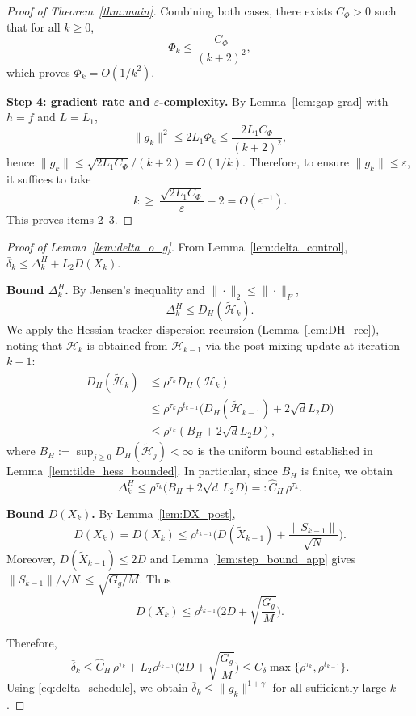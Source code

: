 \documentclass[11pt,a4paper]{article}
\def\cO{O}%
\newcommand{\cO}{\mathcal{O}}
\begin{document}
\begin{proof}[Proof of Theorem~\ref{thm:main}]
Combining both cases, there exists $C_\Phi>0$ such that for all $k\ge 0$,
\[
\Phi_k\le \frac{C_\Phi}{(k+2)^2},
\]
which proves $\Phi_k=\cO(1/k^2)$.

\smallskip
\noindent\textbf{Step 4: gradient rate and $\varepsilon$-complexity.}
By Lemma~\ref{lem:gap-grad} with $h=f$ and $L=L_1$,
\[
\|g_k\|^2\le 2L_1\Phi_k\le \frac{2L_1 C_\Phi}{(k+2)^2},
\]
hence $\|g_k\|\le \sqrt{2L_1 C_\Phi}/(k+2)=\cO(1/k)$.
Therefore, to ensure $\|g_k\|\le \varepsilon$, it suffices to take
\[
k\ \ge\ \frac{\sqrt{2L_1 C_\Phi}}{\varepsilon}-2
=\cO(\varepsilon^{-1}).
\]
This proves items 2--3.
\end{proof}

\begin{proof}[Proof of Lemma~\ref{lem:delta_o_g}]
From Lemma~\ref{lem:delta_control}, $\bar\delta_k\le \Delta_k^H+L_2D(X_k)$.

\smallskip
\noindent\textbf{Bound $\Delta_k^H$.}
By Jensen's inequality and $\|\cdot\|_2\le \|\cdot\|_F$,
\[
\Delta_k^H\le D_H(\tilde{\mathcal H}_k).
\]
We apply the Hessian-tracker dispersion recursion (Lemma~\ref{lem:DH_rec}),
noting that $\mathcal H_k$ is obtained from $\tilde{\mathcal H}_{k-1}$
via the post-mixing update at iteration $k{-}1$:
\begin{align*}
D_H(\tilde{\mathcal H}_k)
&\le \rho^{\tau_k}D_H(\mathcal H_k)\\
&\le \rho^{\tau_k}\rho^{t_{k-1}}\bigl(D_H(\tilde{\mathcal H}_{k-1})
\!+\!2\sqrt{d}L_2D\bigr)\\
&\le \rho^{\tau_k}(B_H\!+\!2\sqrt{d}L_2D),
\end{align*}
where $B_H:=\sup_{j\ge 0}D_H(\tilde{\mathcal H}_j)<\infty$ is the uniform bound
established in Lemma~\ref{lem:tilde_hess_bounded}.
In particular, since $B_H$ is finite, we obtain
\[
\Delta_k^H\le \rho^{\tau_k}\big(B_H+2\sqrt{d}\,L_2D\big)
=:\hat C_H\,\rho^{\tau_k}.
\]

\smallskip
\noindent\textbf{Bound $D(X_k)$.}
By Lemma~\ref{lem:DX_post},
\[
D(X_k)=D(X_k)\le \rho^{t_{k-1}}\Big(D(\tilde X_{k-1})+\frac{\|S_{k-1}\|}{\sqrt N}\Big).
\]
Moreover, $D(\tilde X_{k-1})\le 2D$ and Lemma~\ref{lem:step_bound_app} gives $\|S_{k-1}\|/\sqrt N\le \sqrt{G_g/M}$.
Thus
\[
D(X_k)\le \rho^{t_{k-1}}\Big(2D+\sqrt{\frac{G_g}{M}}\Big).
\]

\smallskip
Therefore,
\[
\bar\delta_k\le \hat C_H\,\rho^{\tau_k}
+L_2\rho^{t_{k-1}}\Big(2D+\sqrt{\frac{G_g}{M}}\Big)
\le C_\delta\max\{\rho^{\tau_k},\rho^{t_{k-1}}\}.
\]
Using \eqref{eq:delta_schedule}, we obtain $\bar\delta_k\le \|g_k\|^{1+\gamma}$ for all sufficiently large $k$.
\end{proof}
\end{document}
